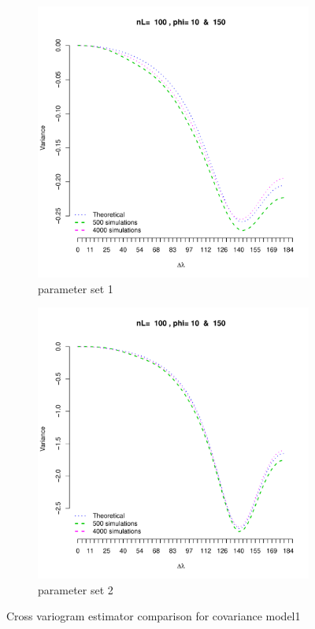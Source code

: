 \begin{figure}[H]
	\begin{subfigure}{.5\textwidth}
		\centering
		\includegraphics[width=1\linewidth]{graphs/results_variogram_model1}
		\caption{parameter set 1}
		\label{fig:sfig1}
	\end{subfigure}
	\begin{subfigure}{.5\textwidth}
		\centering
		\includegraphics[width=1\linewidth]{graphs/results_variogram_model1_2}
		\caption{parameter set 2}
		\label{fig:sfig2}
	\end{subfigure}
	\caption[Cross variogram estimator comparison]{Cross variogram estimator comparison for covariance model1 }
	\label{compare_varigram_sim}
\end{figure}

